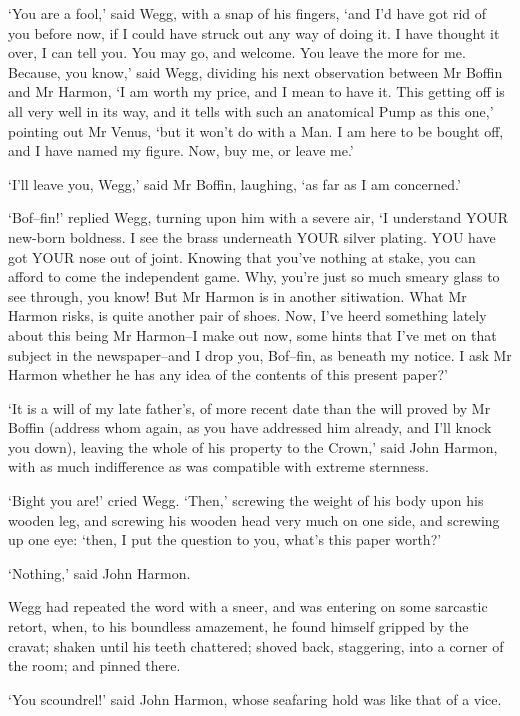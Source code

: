 ‘You are a fool,’ said Wegg, with a snap of his fingers, ‘and I’d have
got rid of you before now, if I could have struck out any way of doing
it. I have thought it over, I can tell you. You may go, and welcome. You
leave the more for me. Because, you know,’ said Wegg, dividing his next
observation between Mr Boffin and Mr Harmon, ‘I am worth my price, and
I mean to have it. This getting off is all very well in its way, and it
tells with such an anatomical Pump as this one,’ pointing out Mr Venus,
‘but it won’t do with a Man. I am here to be bought off, and I have
named my figure. Now, buy me, or leave me.’

‘I’ll leave you, Wegg,’ said Mr Boffin, laughing, ‘as far as I am
concerned.’

‘Bof--fin!’ replied Wegg, turning upon him with a severe air, ‘I
understand YOUR new-born boldness. I see the brass underneath YOUR
silver plating. YOU have got YOUR nose out of joint. Knowing that you’ve
nothing at stake, you can afford to come the independent game. Why,
you’re just so much smeary glass to see through, you know! But Mr Harmon
is in another sitiwation. What Mr Harmon risks, is quite another pair
of shoes. Now, I’ve heerd something lately about this being Mr
Harmon--I make out now, some hints that I’ve met on that subject in
the newspaper--and I drop you, Bof--fin, as beneath my notice. I ask Mr
Harmon whether he has any idea of the contents of this present paper?’

‘It is a will of my late father’s, of more recent date than the will
proved by Mr Boffin (address whom again, as you have addressed him
already, and I’ll knock you down), leaving the whole of his property
to the Crown,’ said John Harmon, with as much indifference as was
compatible with extreme sternness.

‘Bight you are!’ cried Wegg. ‘Then,’ screwing the weight of his body
upon his wooden leg, and screwing his wooden head very much on one side,
and screwing up one eye: ‘then, I put the question to you, what’s this
paper worth?’

‘Nothing,’ said John Harmon.

Wegg had repeated the word with a sneer, and was entering on some
sarcastic retort, when, to his boundless amazement, he found himself
gripped by the cravat; shaken until his teeth chattered; shoved back,
staggering, into a corner of the room; and pinned there.

‘You scoundrel!’ said John Harmon, whose seafaring hold was like that of
a vice.

